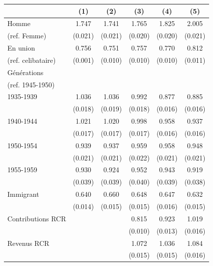 \documentclass[french, 12pt]{article}
\begin{document}
	
	\begin{table}[!htbp]
		\centering
		\small
		\begin{tabular}{lccccc}
			\toprule
						   & (1) 		& (2) 		& (3) 		& (4) 		& (5) 		\\
		\midrule
		Homme  			   & 1.747 		& 1.741 	& 1.765 	& 1.825 	& 2.005 	\\
		(ref. Femme)	   & (0.021)	& (0.021) 	& (0.020) 	& (0.020) 	& (0.021)	\\
		En union		   & 0.756		& 0.751		& 0.757		& 0.770		& 0.812 	\\
		(ref. celibataire) & (0.001)	& (0.010)	& (0.010)	& (0.010)	& (0.011) 	\\
		Générations  &			& 			& 			& 			& 			\\
		(ref. 1945-1950) &&&&&\\
		1935-1939		   & 1.036		& 1.036		& 0.992		& 0.877		& 0.885	 \\
						   & (0.018)	& (0.019)	& (0.018)	& (0.016)	& (0.016) \\
		1940-1944		   & 1.021		& 1.020		& 0.998		& 0.958		& 0.937	 \\
						   & (0.017)	& (0.017)	& (0.017)	& (0.016)	& (0.016) \\
		1950-1954		   & 0.939		& 0.937		& 0.959		& 0.958		& 0.948	 \\
						   & (0.021)	& (0.021)	& (0.022)	& (0.021)	& (0.021) \\
						 
		1955-1959		   & 0.930		& 0.924		& 0.952		& 0.943		& 0.919	 \\
						   & (0.039)	& (0.039)	& (0.040)	& (0.039)	& (0.038) \\
	
						
		Immigrant		   & 0.640		& 0.660		& 0.648		& 0.647		& 0.632	 \\
						   & (0.014)	& (0.015)	& (0.015)	& (0.016)	& (0.015) \\
					
						
		Contributions RCR  & 			& 		& 0.815		& 0.923		& 1.019	 \\
						   & 			& 		& (0.010)	& (0.013)	& (0.016) \\
						   
						  
		Revenus RCR		   & 			& 			& 1.072		& 1.036		& 1.084	 \\
						   & 			& 			& (0.015)	& (0.015)	& (0.016) \\
						   

\end{tabular}
\end{table}
\end{document}
